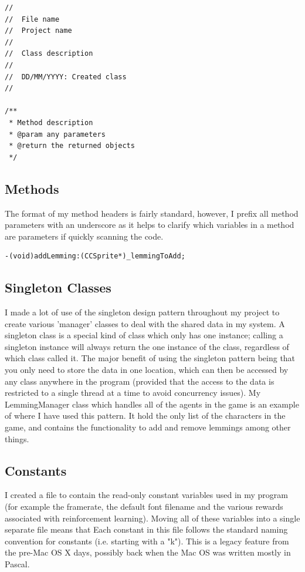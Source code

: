 \documentclass[a4paper,oneside]{report}
\begin{document}
\begin{lstlisting}
//
//  File name
//  Project name
//
//  Class description
//
//  DD/MM/YYYY: Created class
//

/**
 * Method description
 * @param any parameters
 * @return the returned objects
 */\end{lstlisting}

\subsection{Methods}

The format of my method headers is fairly standard, however, I prefix all method parameters with an underscore as it helps to clarify which variables in a method are parameters if quickly scanning the code.

\begin{lstlisting}
-(void)addLemming:(CCSprite*)_lemmingToAdd;
\end{lstlisting}


\subsection{Singleton Classes} 

I made a lot of use of the singleton design pattern throughout my project to create various 'manager' classes to deal with the shared data in my system. A singleton class is a special kind of class which only has one instance; calling a singleton instance will always return the one instance of the class, regardless of which class called it. The major benefit of using the singleton pattern being that you only need to store the data in one location, which can then be accessed by any class anywhere in the program (provided that the access to the data is restricted to a single thread at a time to avoid concurrency issues). My LemmingManager class which handles all of the agents in the game is an example of where I have used this pattern. It hold the only list of the characters in the game, and contains the functionality to add and remove lemmings among other things.

\subsection{Constants} 

I created a file to contain the read-only constant variables used in my program (for example the framerate, the default font filename and the various rewards associated with reinforcement learning). Moving all of these variables into a single separate file means that Each constant in this file follows the standard naming convention for constants (i.e. starting with a "k"). This is a legacy feature from the pre-Mac OS X days, possibly back when the Mac OS was written mostly in Pascal. 
\end{document}
